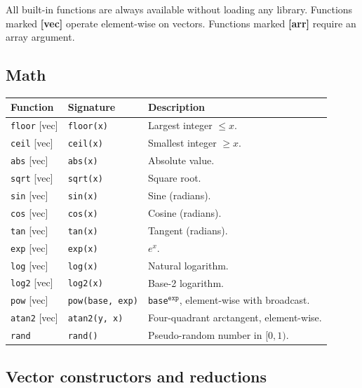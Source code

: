 \documentclass[11pt,a4paper]{article}
\begin{document}
All built-in functions are always available without loading any library.
Functions marked \textbf{[vec]} operate element-wise on vectors.
Functions marked \textbf{[arr]} require an array argument.

\subsection{Math}

\begin{longtable}{@{}L{3.2cm}L{3.8cm}L{7.5cm}@{}}
\toprule
\textbf{Function} & \textbf{Signature} & \textbf{Description} \\
\midrule
\endhead
\texttt{floor} [vec]   & \texttt{floor(x)}        & Largest integer $\le x$. \\
\texttt{ceil} [vec]    & \texttt{ceil(x)}         & Smallest integer $\ge x$. \\
\texttt{abs} [vec]     & \texttt{abs(x)}          & Absolute value. \\
\texttt{sqrt} [vec]    & \texttt{sqrt(x)}         & Square root. \\
\texttt{sin} [vec]     & \texttt{sin(x)}          & Sine (radians). \\
\texttt{cos} [vec]     & \texttt{cos(x)}          & Cosine (radians). \\
\texttt{tan} [vec]     & \texttt{tan(x)}          & Tangent (radians). \\
\texttt{exp} [vec]     & \texttt{exp(x)}          & $e^x$. \\
\texttt{log} [vec]     & \texttt{log(x)}          & Natural logarithm. \\
\texttt{log2} [vec]    & \texttt{log2(x)}         & Base-2 logarithm. \\
\texttt{pow} [vec]     & \texttt{pow(base, exp)}  & \texttt{base}$^{\texttt{exp}}$, element-wise with broadcast. \\
\texttt{atan2} [vec]   & \texttt{atan2(y, x)}     & Four-quadrant arctangent, element-wise. \\
\texttt{rand}          & \texttt{rand()}          & Pseudo-random number in $[0, 1)$. \\
\bottomrule
\end{longtable}

\subsection{Vector constructors and reductions}
\end{document}
